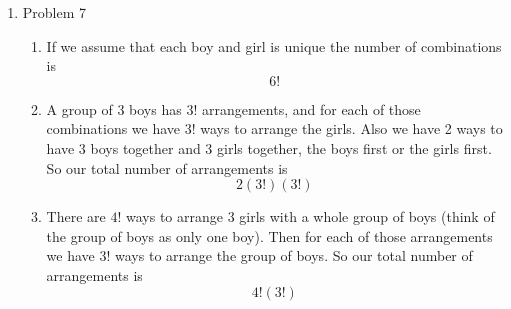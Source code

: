 \documentclass[11pt]{article}
\numberwithin{equation}{section}
\begin{document}

\begin{enumerate}
\item Problem 7
\begin{enumerate}
\item
If we assume that each boy and girl is unique the number of combinations is
$$6!$$
\begin{center}
\end{center}

\item
A group of 3 boys has $3!$ arrangements, and for each of those combinations we have $3!$ ways to arrange the girls. Also we have 2 ways to have 3 boys together and 3 girls together, the boys first or the girls first. So our total number of arrangements is 
$$2(3!)(3!)$$
\begin{center}
\end{center}

\item
There are $4!$ ways to arrange 3 girls with a whole group of boys (think of the group of boys as only one boy). Then for each of those arrangements we have $3!$ ways to arrange the group of boys. So our total number of arrangements is
$$4!(3!)$$
\begin{center}
\end{center}


\end{enumerate}
\end{enumerate}
\end{document}
